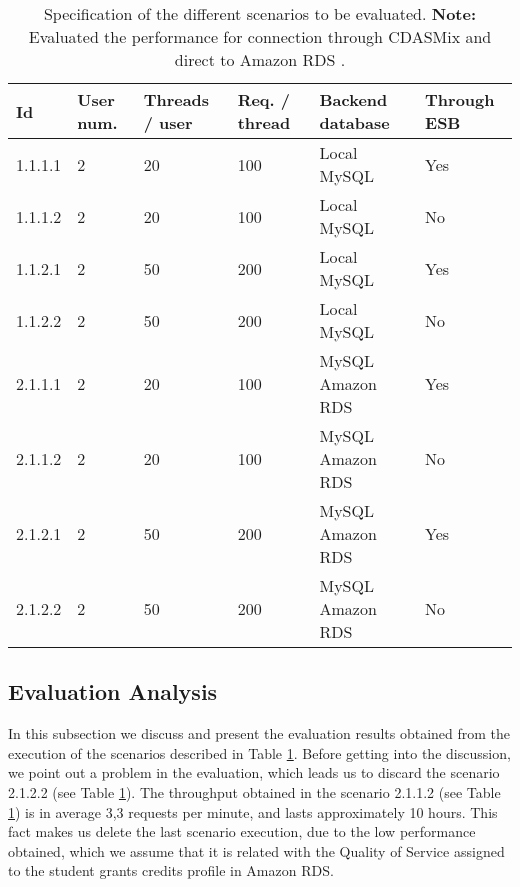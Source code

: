 \begin{table}[htbp]
\centering
\begin{tabular}{llllll}

	\toprule
	Id 		& User num.	& Threads / user		& Req. / thread 		& Backend database	& Through ESB\\
	 \midrule
	 
	 1.1.1.1 						& 2 		& 20						& 100			& Local MySQL			& Yes\\
	 1.1.1.2 						& 2 		& 20						& 100			& Local MySQL			& No\\
	 1.1.2.1 						& 2 		& 50						& 200			& Local MySQL			& Yes\\
	 1.1.2.2 						& 2 		& 50						& 200			& Local MySQL			& No\\
	 2.1.1.1						& 2		& 20						& 100			& MySQL Amazon RDS	& Yes\\
	 2.1.1.2						& 2 		& 20						& 100			& MySQL Amazon RDS	& No	\\
	 2.1.2.1						& 2 		& 50						& 200			& MySQL Amazon RDS	& Yes\\
	 2.1.2.2						& 2 		& 50						& 200			& MySQL Amazon RDS	& No\\
	 
	 
	\bottomrule
\end{tabular}
\caption[CDASMix Evaluation Performance Scenarios]{Specification of the different scenarios to be evaluated. \textbf{Note: } Evaluated the performance for connection through CDASMix and direct to Amazon RDS \cite{amazonrds}.}
	\label{tab:evaluation}
\end{table}

\FloatBarrier

\subsection{Evaluation Analysis}

In this subsection we discuss and present the evaluation results obtained from the execution of the scenarios described in Table \ref{tab:evaluation}. Before getting into the discussion, we point out a problem in the evaluation, which leads us to discard the scenario 2.1.2.2 (see Table \ref{tab:evaluation}). The throughput obtained in the scenario 2.1.1.2 (see Table \ref{tab:evaluation}) is in average 3,3 requests per minute, and lasts approximately 10 hours. This fact makes us delete the last scenario execution, due to the low performance obtained, which we assume that it is related with the Quality of Service assigned to the student grants credits profile in Amazon RDS. 

